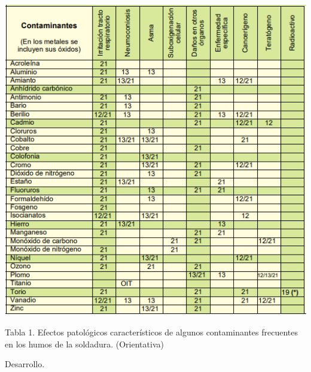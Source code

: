 \documentclass[12pt,letterpaper]{article}
\begin{document}
\includegraphics[scale=1.3]{imag4.png}  

\begin{center}
Tabla 1. Efectos patológicos característicos de algunos contaminantes frecuentes en los humos de la soldadura. (Orientativa)
\end{center}

\newpage

Desarrollo.
\\\\
\end{document}
